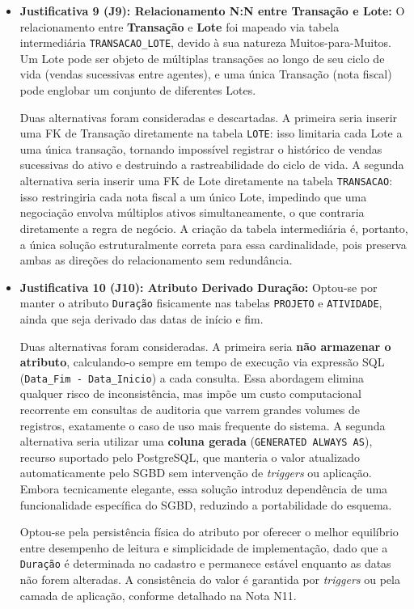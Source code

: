 \documentclass[12pt]{article}
\begin{document}
\begin{itemize}
    \item \textbf{Justificativa 9 (J9): Relacionamento N:N entre Transação e Lote:}
    O relacionamento entre \textbf{Transação} e \textbf{Lote} foi mapeado via tabela intermediária \texttt{TRANSACAO\_LOTE}, devido à sua natureza Muitos-para-Muitos. Um Lote pode ser objeto de múltiplas transações ao longo de seu ciclo de vida (vendas sucessivas entre agentes), e uma única Transação (nota fiscal) pode englobar um conjunto de diferentes Lotes.
 
    Duas alternativas foram consideradas e descartadas. A primeira seria inserir uma FK de Transação diretamente na tabela \texttt{LOTE}: isso limitaria cada Lote a uma única transação, tornando impossível registrar o histórico de vendas sucessivas do ativo e destruindo a rastreabilidade do ciclo de vida. A segunda alternativa seria inserir uma FK de Lote diretamente na tabela \texttt{TRANSACAO}: isso restringiria cada nota fiscal a um único Lote, impedindo que uma negociação envolva múltiplos ativos simultaneamente, o que contraria diretamente a regra de negócio. A criação da tabela intermediária é, portanto, a única solução estruturalmente correta para essa cardinalidade, pois preserva ambas as direções do relacionamento sem redundância.
 
    \item \textbf{Justificativa 10 (J10): Atributo Derivado Duração:}
    Optou-se por manter o atributo \texttt{Duração} fisicamente nas tabelas \texttt{PROJETO} e \texttt{ATIVIDADE}, ainda que seja derivado das datas de início e fim.
 
    Duas alternativas foram consideradas. A primeira seria \textbf{não armazenar o atributo}, calculando-o sempre em tempo de execução via expressão SQL (\texttt{Data\_Fim - Data\_Inicio}) a cada consulta. Essa abordagem elimina qualquer risco de inconsistência, mas impõe um custo computacional recorrente em consultas de auditoria que varrem grandes volumes de registros, exatamente o caso de uso mais frequente do sistema. A segunda alternativa seria utilizar uma \textbf{coluna gerada} (\texttt{GENERATED ALWAYS AS}), recurso suportado pelo PostgreSQL, que manteria o valor atualizado automaticamente pelo SGBD sem intervenção de \textit{triggers} ou aplicação. Embora tecnicamente elegante, essa solução introduz dependência de uma funcionalidade específica do SGBD, reduzindo a portabilidade do esquema.
 
    Optou-se pela persistência física do atributo por oferecer o melhor equilíbrio entre desempenho de leitura e simplicidade de implementação, dado que a \texttt{Duração} é determinada no cadastro e permanece estável enquanto as datas não forem alteradas. A consistência do valor é garantida por \textit{triggers} ou pela camada de aplicação, conforme detalhado na Nota N11.
 
\end{itemize}
 
\end{document}

